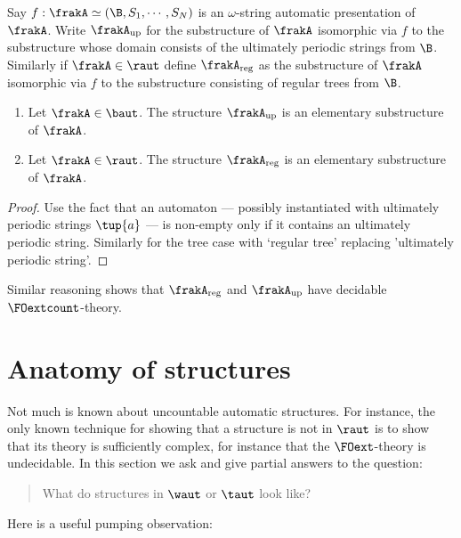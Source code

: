 Say $f:\frakA \simeq (\B,S_1,\cdots,S_N)$ is an $\omega$-string automatic presentation of $\frakA$. %
Write $\frakA_{\rm{up}}$ for the substructure of $\frakA$ isomorphic via $f$ to the substructure whose domain consists of the ultimately periodic strings from $\B$.
Similarly if $\frakA \in \raut$ define $\frakA_{\rm{reg}}$ as the substructure of $\frakA$ isomorphic via $f$ to the substructure consisting of regular trees from $\B$.

\begin{proposition} \cite{BKRu08,HKMN08}
\begin{enumerate}
\item Let $\frakA \in \baut$. The structure $\frakA_{\rm{up}}$ is an elementary substructure of $\frakA$.
\item Let $\frakA \in \raut$. The structure $\frakA_{\rm{reg}}$ is an elementary substructure of $\frakA$.
\end{enumerate}
\end{proposition}

\begin{proof}
Use the fact that an automaton --- possibly instantiated with ultimately periodic strings $\tup{a}$ --- is non-empty only if it contains an ultimately periodic string. Similarly for the tree case with `regular tree' replacing 'ultimately periodic string'. %
\end{proof}



Similar reasoning shows that $\frakA_{\rm{reg}}$ and $\frakA_{\rm{up}}$ have decidable $\FOextcount$-theory.




\section{Anatomy of structures}



Not much is known about uncountable automatic structures. For instance, the only known technique for showing that a structure
is not in $\raut$ is to show that its theory is sufficiently complex, for instance that the $\FOext$-theory is undecidable.
In this section we ask and give partial answers to the question:
\begin{quote}
What do structures in $\waut$ or $\taut$ look like?
\end{quote}
Here is a useful pumping observation:


